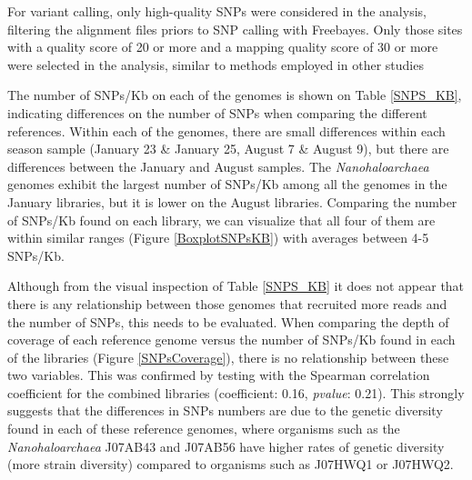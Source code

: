 For variant calling, only high-quality SNPs were considered in the analysis, filtering the alignment files priors to SNP calling with Freebayes. Only those sites with a quality score of 20 or more and a mapping quality score of 30 or more were selected in the analysis, similar to methods employed in other studies \cite{Schloissnig:2012hx}

The number of SNPs/Kb on each of the genomes is shown on Table \ref{SNPS_KB}, indicating differences on the number of SNPs when comparing the different references. Within each of the genomes, there are small differences within each season sample (January 23 \& January 25, August 7 \& August 9), but there are differences between the January and August samples. The \textit{Nanohaloarchaea} genomes exhibit the largest number of SNPs/Kb among all the genomes in the January libraries, but it is lower on the August libraries. Comparing the number of SNPs/Kb found on each library, we can visualize that all four of them are within similar ranges (Figure \ref{BoxplotSNPsKB}) with averages between 4-5 SNPs/Kb.

Although from the visual inspection of Table \ref{SNPS_KB} it does not appear that there is any relationship between those genomes that recruited more reads and the number of SNPs, this needs to be evaluated. When comparing the depth of coverage of each reference genome versus the number of SNPs/Kb found in each of the libraries (Figure \ref{SNPsCoverage}), there is no relationship between these two variables. This was confirmed by testing with the Spearman correlation coefficient for the combined libraries (coefficient: 0.16, \textit{pvalue}: 0.21). This strongly suggests that the differences in SNPs numbers are due to the genetic diversity found in each of these reference genomes, where organisms such as the \textit{Nanohaloarchaea} J07AB43 and J07AB56 have higher rates of genetic diversity (more strain diversity) compared to organisms such as J07HWQ1 or J07HWQ2.

